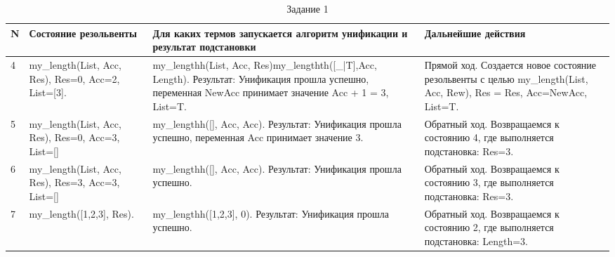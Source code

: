 \documentclass[a4paper,14pt, unknownkeysallowed]{extreport}
\begin{document}
\begin{table}[]
	\centering
	\caption{Задание 1}
	\label{task1}
	\begin{tabular}{|p{0.8cm}|p{4cm}|p{7.5cm}|p{4cm}|}
		\hline
		\textbf{N} & \textbf{Состояние резольвенты} & \textbf{Для каких термов запускается алгоритм унификации и результат подстановки} & \textbf{Дальнейшие действия} \\ 
		\hline
		4 & my\_length(List, Acc, Res), Res=0, Acc=2, List=[3]. &my\_lengthh(List, Acc, Res)my\_lengthth([\_|T],Acc, Length). Результат: Унификация прошла успешно, переменная NewAcc принимает значение Acc + 1 = 3, List=T. & Прямой ход. Создается новое состояние резольвенты с целью my\_length(List, Acc, Rew), Res = Res, Acc=NewAcc, List=T. \\
		\hline
		5 & my\_length(List, Acc, Res), Res=0, Acc=3, List=[] &my\_lengthh([], Acc, Acc). Результат: Унификация прошла успешно, переменная Acc принимает значение 3. & Обратный ход. Возвращаемся к состоянию 4, где выполняется подстановка: Res=3. \\
		\hline
		6 & my\_length(List, Acc, Res), Res=3, Acc=3, List=[] &my\_lengthh([], Acc, Acc). Результат: Унификация прошла успешно. & Обратный ход. Возвращаемся к состоянию 3, где выполняется подстановка: Res=3. \\
		\hline
		7 & my\_length([1,2,3], Res). &my\_lengthh([1,2,3], 0). Результат: Унификация прошла успешно. & Обратный ход. Возвращаемся к состоянию 2, где выполняется подстановка: Length=3. \\
		\hline
	\end{tabular}
\end{table}
\end{document}
